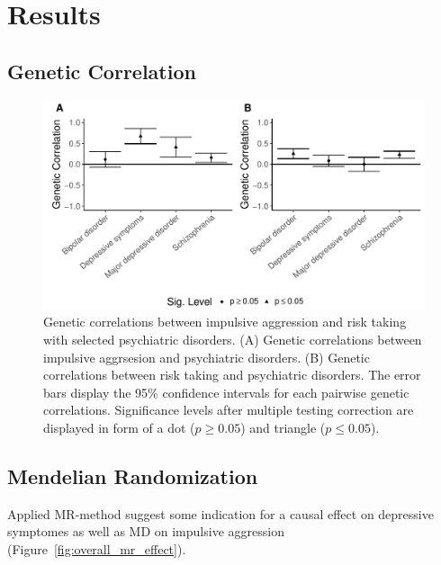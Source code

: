 \section{Results}
\label{sec:results}

\subsection{Genetic Correlation}
\label{sub:psych_genetic_correlation}





\begin{figure}[htpb]
  \centering
  \includegraphics[width=0.8\linewidth]{figures/combined_corr.pdf}
  \caption{Genetic correlations between impulsive aggression and risk taking with selected psychiatric disorders.
    (A) Genetic correlations between impulsive aggrsesion and psychiatric disorders. 
    (B) Genetic correlations between risk taking and psychiatric disorders.
    The error bars display the 95\% confidence intervals for each pairwise genetic correlations.
    Significance levels after multiple testing correction are displayed in form of a dot ($p\ge 0.05$) and triangle ($p\leq0.05$).
  }\label{fig:figures/combined_corr}
\end{figure}

\subsection{Mendelian Randomization}
\label{sub:mendelian_randomization}

Applied MR-method suggest some indication for a causal effect on depressive symptomes as well as MD on impulsive aggression (Figure~\ref{fig:overall_mr_effect}).

